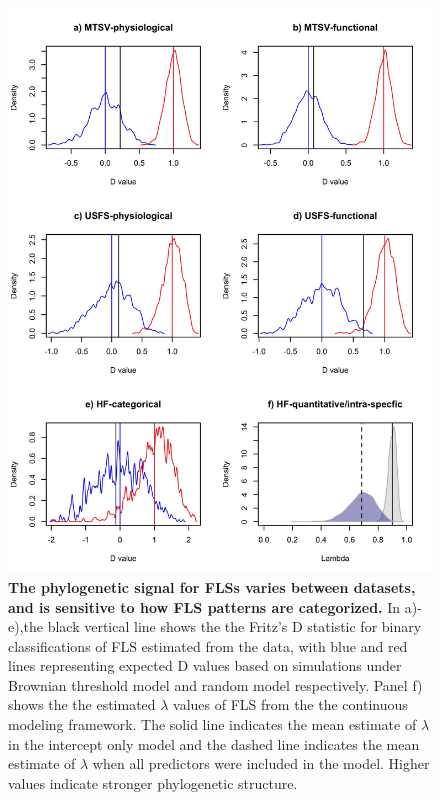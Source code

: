 \documentclass[11pt]{article}
\begin{document}
\begin{figure}[H]
\centering
\includegraphics[height=0.8\textheight]{..//..//phylosig.jpeg} 
\caption{\textbf{The phylogenetic signal for FLSs varies between datasets, and is sensitive to how FLS patterns are categorized.} In a)-e),the black vertical line shows the the Fritz's D statistic for binary classifications of FLS estimated from the data, with blue and red lines representing expected D values based on simulations under Brownian threshold model and random model respectively. Panel f) shows the the estimated $\lambda$ values of FLS from the the continuous modeling framework. The solid line indicates the mean estimate of $\lambda$ in the intercept only model and the dashed line indicates the mean estimate of $\lambda$ when all predictors were included in the model. Higher values indicate stronger phylogenetic structure.}
\label{fig:Dstat}
\end{figure}
\end{document}
